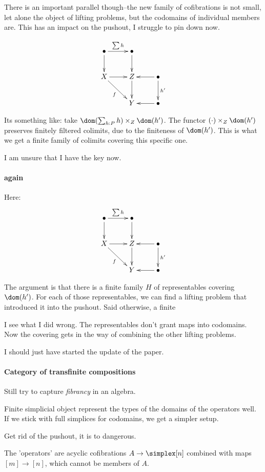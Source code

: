 \documentclass[csh.tex]{subfiles}
\begin{document}
There is an important parallel though--the new family of cofibrations is not small, let alone the object of lifting problems, but the codomains of individual members are. This has an impact on the pushout, I struggle to pin down now. 

\[\xymatrix{
\bullet \ar[d]\ar[r]^{\sum h} & \bullet\ar[d]\\
X\ar[dr]_f\ar[r]& Z \ar[d] & \bullet \ar[l]\ar[d]^{h'}\\
& Y& \bullet \ar[l]
}\]

Its something like: take $\dom(\sum_{h\of P} h)\times_Z\dom(h')$. The functor $(\cdot)\times_Z\dom(h')$ preserves finitely filtered colimits, due to the finiteness of $\dom(h')$. This is what we get a finite family of colimits covering this specific one.

I am unsure that I have the key now. 

\paragraph{again}
Here:
\[\xymatrix{
\bullet \ar[d]\ar[r]^{\sum h} & \bullet\ar[d]\\
X\ar[dr]_f\ar[r]& Z \ar[d] & \bullet \ar[l]\ar[d]^{h'}\\
& Y& \bullet \ar[l]
}\]

The argument is that there is a finite family $H$ of representables covering $\dom(h')$. For each of those representables, we can find a lifting problem that introduced it into the pushout. Said otherwise, a finite 

I see what I did wrong. The representables don't grant maps into codomains. Now the covering gets in the way of combining the other lifting problems.

I should just have started the update of the paper.

\paragraph{Category of transfinite compositions}
Still try to capture \emph{fibrancy} in an algebra.

Finite simplicial object represent the types of the domains of the operators well. If we stick with full simplices for codomains, we get a simpler setup.
 
Get rid of the pushout, it is to dangerous.

The 'operators' are acyclic cofibrations $A \to \simplex[n]$ combined with maps $[m]\to [n]$, which cannot be members of $A$. 
\end{document}
